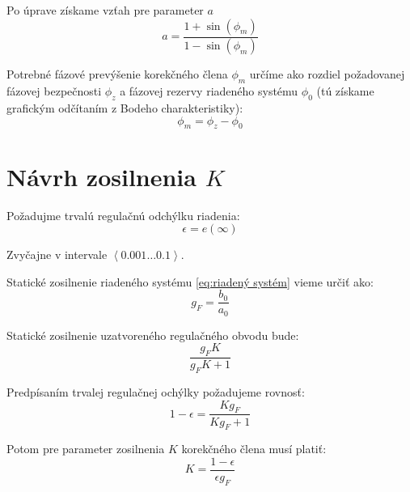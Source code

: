 \documentclass[a4paper,10pt]{article}
\begin{document}
Po úprave získame vzťah pre parameter $a$
\begin{equation}
\label{eq:a}
 a=\frac{1+\sin(\phi_m)}{1-\sin(\phi_m)}
\end{equation}

Potrebné fázové prevýšenie korekčného člena $\phi_m$ určíme ako rozdiel požadovanej fázovej bezpečnosti $\phi_z$ a fázovej rezervy riadeného systému $\phi_0$ (tú získame grafickým odčítaním z Bodeho charakteristiky):
\begin{equation}
\label{eq:phi_m}
\phi_m=\phi_z-\phi_0
\end{equation}

\pagebreak

\section{Návrh zosilnenia $K$} 
Požadujme trvalú regulačnú odchýlku riadenia:
\begin{equation}
\epsilon=e(\infty)
\end{equation}

Zvyčajne v intervale $\left<0.001 \ldots 0.1 \right>$.

Statické zosilnenie riadeného systému \eqref{eq:riadený systém} vieme určiť ako:
\begin{equation}
\label{eq:g_F}
g_F=\frac{b_0}{a_0}
\end{equation}

Statické zosilnenie uzatvoreného regulačného obvodu bude:
\begin{equation}
 \frac{g_F K}{g_F K+1}
\end{equation}

Predpísaním trvalej regulačnej ochýlky požadujeme rovnosť:
\begin{equation}
1-\epsilon=\frac{K g_F}{K g_F+1}
\end{equation} 

Potom pre parameter zosilnenia $K$ korekčného člena musí platiť:
\begin{equation}
\label{eq:K}
K=\frac{1-\epsilon}{\epsilon g_F}
\end{equation}
\end{document}
